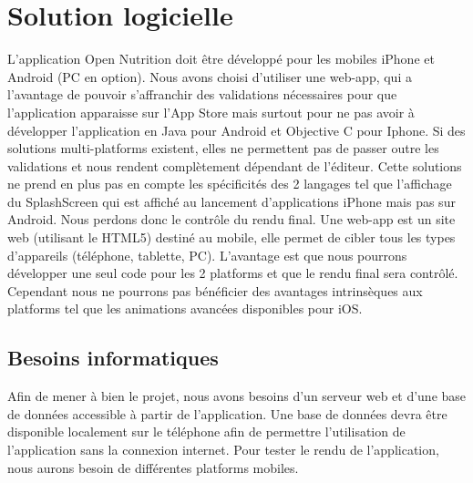 \section{Solution logicielle}
L'application Open Nutrition doit être développé pour les mobiles iPhone et Android (PC en option). Nous avons choisi d'utiliser une web-app, qui a l'avantage de pouvoir s'affranchir des validations nécessaires pour que l'application apparaisse sur l'App Store mais surtout pour ne pas avoir à développer l'application en Java pour Android et Objective C pour Iphone. Si des solutions multi-platforms existent, elles ne permettent pas de passer outre les validations et nous rendent complètement dépendant de l'éditeur. Cette solutions ne prend en plus pas en compte les spécificités des 2 langages tel que l'affichage du SplashScreen qui est affiché au lancement d'applications iPhone mais pas sur Android. Nous perdons donc le contrôle du rendu final. 
Une web-app est un site web (utilisant le HTML5) destiné au mobile, elle permet de cibler tous les types d'appareils (téléphone, tablette, PC). L'avantage est que nous pourrons développer une seul code pour les 2 platforms et que le rendu final sera contrôlé. Cependant nous ne pourrons pas bénéficier des avantages intrinsèques aux platforms tel que les animations avancées disponibles pour iOS.

\subsection{Besoins informatiques} 
Afin de mener à bien le projet, nous avons besoins d'un serveur web et d'une base de données accessible à partir de l'application. Une base de données devra être disponible localement sur le téléphone afin de permettre l'utilisation de l'application sans la connexion internet.
Pour tester le rendu de l'application, nous aurons besoin de différentes platforms mobiles.

